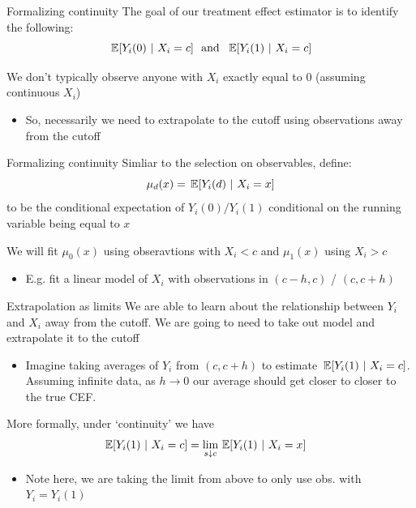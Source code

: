 \documentclass[aspectratio=169,t,11pt,table]{beamer}
\begin{document}

\begin{frame}{Formalizing continuity}
  The goal of our treatment effect estimator is to identify the following:
  $$
    \expec{Y_i(0)}{X_i = c} \ \text{ and }\ \expec{Y_i(1)}{X_i = c}
  $$

  We don't typically observe anyone with $X_i$ exactly equal to 0 (assuming continuous $X_i$)
  \begin{itemize}
    \item So, necessarily we need to extrapolate to the cutoff using observations away from the cutoff
  \end{itemize}
\end{frame}

\begin{frame}{Formalizing continuity}
  Simliar to the selection on observables, define:
  $$
    \mu_d(x) = \expec{Y_i(d)}{X_i = x}
  $$
  to be the conditional expectation of $Y_i(0)/Y_i(1)$ conditional on the running variable being equal to $x$

  \bigskip
  We will fit $\mu_0(x)$ using obseravtions with $X_i < c$ and $\mu_1(x)$ using $X_i > c$
  \begin{itemize}
    \item E.g. fit a linear model of $X_i$ with observations in $(c - h, c)$ / $(c, c+h)$
  \end{itemize}
\end{frame}

\begin{frame}{Extrapolation as limits}
  We are able to learn about the relationship between $Y_i$ and $X_i$ away from the cutoff. We are going to need to take out model and \alert{extrapolate} it to the cutoff 
  \begin{itemize}
    \item Imagine taking averages of $Y_i$ from $(c, c+h)$ to estimate $\expec{Y_i(1)}{X_i = c}$. Assuming infinite data, as $h \to 0$ our average should get closer to closer to the true CEF.
  \end{itemize}
  
  \bigskip
  More formally, under `continuity' we have
  \begin{align*}
    \expec{Y_i(1)}{X_i = c} 
    &= \lim_{s \downarrow c} \expec{Y_i(1)}{X_i = x}
  \end{align*}
  \begin{itemize}
    \item Note here, we are taking the limit from above to only use obs. with $Y_i = Y_i(1)$
  \end{itemize}
\end{frame}
\end{document}
